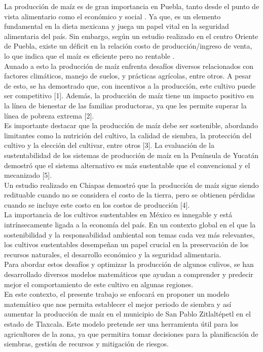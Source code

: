 \documentclass[utf8]{FrontiersinHarvard} %
\begin{document}
La producción de maíz es de gran importancia en Puebla, tanto desde el punto de vista alimentario como el económico y social \citep{Zepeda2020LaPE}. 
Ya que, es un elemento fundamental en la dieta mexicana y juega un papel vital en la seguridad alimentaria del país. 
Sin embargo, según un estudio realizado en el centro Oriente de Puebla, existe un déficit en la relación costo de producción/ingreso de venta, 
lo que indica que el maíz es eficiente pero no rentable \citep{Cita1}.\\
Aunado a esto la producción de maíz enfrenta desafíos diversos relacionados con factores climáticos, manejo de suelos, y prácticas agrícolas, entre otros.  A pesar de esto, se ha demostrado que, con incentivos a la producción, este cultivo puede ser competitivo [1]. 
Además, la producción de maíz tiene un impacto positivo en la línea de bienestar de las familias productoras, ya que les permite superar la línea de pobreza extrema [2].\\
Es importante destacar que la producción de maíz debe ser sostenible, abordando limitantes como la nutrición del cultivo, la calidad de siembra, la protección del cultivo y la elección del cultivar, entre otros [3]. 
La evaluación de la sustentabilidad de los sistemas de producción de maíz en la Península de Yucatán demostró que el sistema alternativo es más sustentable que el convencional y el mecanizado [5].\\

Un estudio realizado en Chiapas demostró que la producción de maíz sigue siendo redituable cuando no se considera el costo de la tierra, pero se obtienen pérdidas cuando se incluye este costo en los costos de producción [4].
\\
La importancia de los cultivos sustentables en México es innegable y está intrínsecamente ligada a la economía del país. En un contexto global en el que la sostenibilidad y la responsabilidad ambiental son temas cada vez más relevantes, los cultivos sustentables desempeñan un papel crucial en la preservación de los recursos naturales, el desarrollo económico y la seguridad alimentaria.
\\
Para abordar estos desafíos y optimizar la producción de algunos culivos, se han desarrollado diversos modelos matemáticos que ayudan a comprender y predecir mejor el comportamiento de este cultivo en algunas regiones.
\\
En este contexto, el presente trabajo se enfocará en proponer un modelo matemático que nos permita establecer el mejor periodo de siembra y así aumentar la producción de maíz en el municipio de San Pablo Zitlaltépetl en el estado de Tlaxcala. Este modelo pretende ser una herramienta útil para los agricultores de la zona, ya que permitira tomar decisiones para la planificación de siembras, gestión de recursos y mitigación de riesgos.
\end{document}
